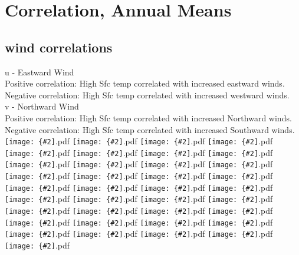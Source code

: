 \documentclass[12pt,a4paper]{article}
\newcommand{\pdffig}[2][0.5]{\texttt{[image: \{\#2]}.pdf}}
\begin{document}
\section{Correlation, Annual Means}
\subsection{wind correlations}
u - Eastward Wind\\
Positive correlation: High Sfc temp correlated with increased eastward winds.\\
Negative correlation: High Sfc temp correlated with increased westward winds.\\
v - Northward Wind\\
Positive correlation: High Sfc temp correlated with increased Northward winds.\\
Negative correlation: High Sfc temp correlated with increased Southward winds.\\
\pdffig[0.5]{Correlation_Aus_tsfc_u_hig}
\pdffig[0.5]{Correlation_Aus_tsfc_u_low}
\pdffig[0.5]{Correlation_Aus_tsfc_v_high}
\pdffig[0.5]{Correlation_Aus_tsfc_v_low}
\pdffig[0.5]{Correlation_Aus_tsfc_w_high}
\pdffig[0.5]{Correlation_Aus_tsfc_w_low}
\pdffig[0.5]{Correlation_India_tsfc_u_hig}
\pdffig[0.5]{Correlation_India_tsfc_u_low}
\pdffig[0.5]{Correlation_India_tsfc_v_high}
\pdffig[0.5]{Correlation_India_tsfc_v_low}
\pdffig[0.5]{Correlation_India_tsfc_w_high}
\pdffig[0.5]{Correlation_India_tsfc_w_low}
\pdffig[0.5]{Correlation_MC_tsfc_u_hig}
\pdffig[0.5]{Correlation_MC_tsfc_u_low}
\pdffig[0.5]{Correlation_MC_tsfc_v_high}
\pdffig[0.5]{Correlation_MC_tsfc_v_low}
\pdffig[0.5]{Correlation_MC_tsfc_w_high}
\pdffig[0.5]{Correlation_MC_tsfc_w_low}
\pdffig[0.5]{Correlation_NthEastAfr_tsfc_u_hig}
\pdffig[0.5]{Correlation_NthEastAfr_tsfc_u_low}
\pdffig[0.5]{Correlation_NthEastAfr_tsfc_v_high}
\pdffig[0.5]{Correlation_NthEastAfr_tsfc_v_low}
\pdffig[0.5]{Correlation_NthEastAfr_tsfc_w_high}
\pdffig[0.5]{Correlation_NthEastAfr_tsfc_w_low}
\pdffig[0.5]{Correlation_NthWestAfr_tsfc_u_hig}
\pdffig[0.5]{Correlation_NthWestAfr_tsfc_u_low}
\pdffig[0.5]{Correlation_NthWestAfr_tsfc_v_high}
\pdffig[0.5]{Correlation_NthWestAfr_tsfc_v_low}
\pdffig[0.5]{Correlation_NthWestAfr_tsfc_w_high}
\pdffig[0.5]{Correlation_NthWestAfr_tsfc_w_low}
\pdffig[0.5]{Correlation_SthAfr_tsfc_u_hig}
\pdffig[0.5]{Correlation_SthAfr_tsfc_u_low}
\pdffig[0.5]{Correlation_SthAfr_tsfc_v_high}
\pdffig[0.5]{Correlation_SthAfr_tsfc_v_low}
\pdffig[0.5]{Correlation_SthAfr_tsfc_w_high}
\pdffig[0.5]{Correlation_SthAfr_tsfc_w_low}
\pdffig[0.5]{Correlation_SthSthAm_tsfc_u_hig}
\end{document}
